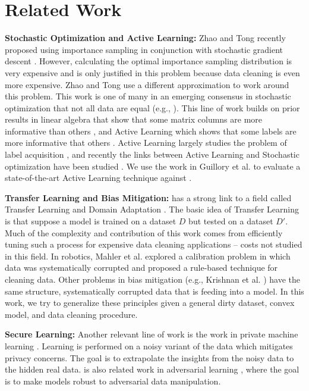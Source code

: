 
\section{Related Work}
\noindent \textbf{Stochastic Optimization and Active Learning: } Zhao and Tong recently proposed using importance sampling in conjunction with stochastic gradient descent \cite{zhao2014stochastic}. 
However, calculating the optimal importance sampling distribution is very expensive and is only justified in this problem because data cleaning is even more expensive. 
Zhao and Tong use a different approximation to work around this problem. 
This work is one of many in an emerging consensus in stochastic optimization that not all data are equal (e.g., \cite{qu2014randomized}). 
This line of work builds on prior results in linear algebra that show that some matrix columns are more informative than others \cite{drineas2012fast}, and Active Learning which shows that some labels are more informative that others \cite{settles2010active}.
Active Learning largely studies the problem of label acquisition \cite{settles2010active},
and recently the links between Active Learning and Stochastic optimization have been studied \cite{guillory2009active}. 
We use the work in Guillory et al. to evaluate a state-of-the-art Active Learning technique against \sys.

\noindent \textbf{Transfer Learning and Bias Mitigation: }  
\sys has a strong link to a field called Transfer Learning and Domain Adaptation \cite{pan2010survey}. The basic idea of Transfer Learning is that suppose a model is trained on a dataset $D$ but tested on a dataset $D'$. Much of the complexity and contribution of this work comes from efficiently tuning such a process for expensive data cleaning applications -- costs not studied in this field.
In robotics, Mahler et al. explored a calibration problem in which data was systematically corrupted \cite{DBLP:conf/case/MahlerKLSMKPWFAG14} and proposed a rule-based technique for cleaning data.
Other problems in bias mitigation (e.g., Krishnan et al. \cite{DBLP:conf/recsys/KrishnanPFG14}) have the same structure, systematically corrupted data that is feeding into a model.
In this work, we try to generalize these principles given a general dirty dataset, convex model, and data cleaning procedure.

\noindent \textbf{Secure Learning: } Another relevant line of work is the work in private machine learning  \cite{wainwright2012privacy, duchi2013local}. Learning is performed on a noisy variant of the data which mitigates privacy concerns. The goal is to extrapolate the insights from the noisy data to the hidden real data. \sys is also related work in adversarial learning \cite{nelson2012query}, where the goal is to make models robust to adversarial data manipulation.

